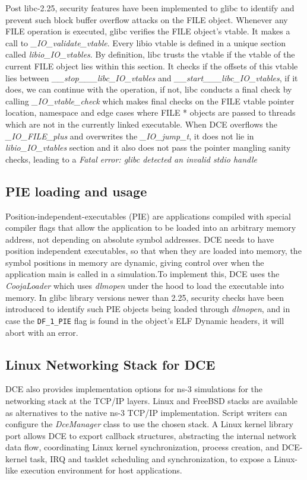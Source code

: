 \documentclass{sig-alternate}
\begin{document}
\sloppy Post libc-2.25, security features have been implemented to glibc to identify 
and prevent such block buffer overflow attacks on the FILE object. Whenever any FILE
operation is executed, glibc 
verifies the FILE object's vtable. It makes a call to 
\textit{\_IO\_validate\_vtable}. Every libio vtable is defined in a unique section called \textit{libio\_IO\_vtables}. By definition, libc trusts
the vtable if the vtable of the current FILE object lies within this section. It checks if the offsets of this vtable lies between 
\textit{\_\_stop\_\_\_libc\_IO\_vtables} and \textit{\_\_start\_\_\_libc\_IO\_vtables}, if it does, we can continue with the operation, if not, libc 
conducts a final check by calling \textit{\_IO\_vtable\_check} which makes final checks on the FILE vtable pointer location, namespace and edge cases
where FILE * objects are passed to threads which are not in the currently linked executable.  When DCE overflows the \textit{\_IO\_FILE\_plus} and 
overwrites the \textit{\_IO\_jump\_t}, it does not lie in \textit{libio\_IO\_vtables} section and it also does not pass the pointer mangling sanity checks, leading to 
a \textit{Fatal error: glibc detected an invalid stdio handle}

\subsection{PIE loading and usage}
Position-independent-executables (PIE) are applications compiled with special compiler flags that allow the application to be loaded into an arbitrary
memory address, not depending on absolute symbol addresses. DCE needs to have position independent executables, so that when they are loaded into memory,
the symbol positions in memory are dynamic, giving control over when the application main is called in a simulation.To implement this, DCE uses the \textit{CoojaLoader}
which uses \textit{dlmopen} under the hood to load the executable into memory. In glibc library versions newer than 2.25, security checks have been introduced to 
identify such PIE objects being loaded through \textit{dlmopen}, and in case the \texttt{DF\_1\_PIE} flag is found in the object's ELF Dynamic headers, it will abort 
with an error.
 

\subsection{Linux Networking Stack for DCE}
DCE also provides implementation options for ns-3 simulations for the networking stack at the TCP/IP layers.  
Linux and FreeBSD stacks are available as alternatives to the native ns-3 TCP/IP implementation.
Script writers can configure the \textit{DceManager} class to use the chosen stack.
A Linux kernel library port allows DCE to export callback structures, abstracting the internal network data flow, coordinating Linux kernel synchronization, 
process creation, and DCE-kernel task, IRQ and tasklet scheduling and synchronization, to expose a Linux-like execution environment for host applications. 
\end{document}
